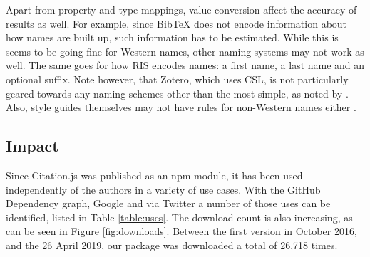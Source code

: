 \documentclass[fleqn,10pt,lineno]{wlpeerj} %
\begin{document}
Apart from property and type mappings, value conversion affect the accuracy of results as well. For example, since BibTeX does not encode information about how names are built up, such information has to be estimated. While this is seems to be going fine for Western names, other naming systems may not work as well. The same goes for how RIS encodes names: a first name, a last name and an optional suffix. Note however, that Zotero, which uses CSL, is not particularly geared towards any naming schemes other than the most simple, as noted by 
\cite{darcus_non-western_2008}. Also, style guides themselves may not have rules for non-Western names either \citep{qiu_scientific_2008,puniamoorthy_give_2008}.

\subsection*{Impact}

Since Citation.js was published as an npm module, it has been used independently of the authors in a variety of use cases. With the GitHub Dependency graph, Google and via Twitter a number of those uses can be identified, listed in Table \ref{table:uses}. The download count is also increasing, as can be seen in Figure \ref{fig:downloads}. Between the first version in October 2016, and the 26 April 2019, our package was downloaded a total of 26,718 times.
\end{document}
